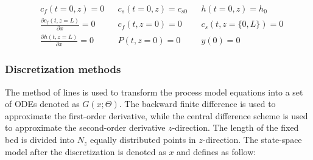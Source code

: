 \documentclass[../Article_Model_Parameters.tex]{subfiles}
\begin{document}

			
			{\footnotesize
				\begin{align*}
					&c_f(t = 0, z) = 0 && c_s(t = 0, z) = c_{s0} && h(t = 0, z) = h_0 \\
					&\frac{\partial c_f(t,z=L)}{\partial x} = 0 && c_f(t, z=0) = 0 && c_s(t, z=\{0,L\}) = 0 \\
					&\frac{\partial h(t,z=L)}{\partial x} = 0 && P(t, z=0) = 0  && y(0) = 0
			\end{align*} }
			
		\subsubsection{Discretization methods}
		
		The method of lines is used to transform the process model equations into a set of ODEs denoted as $G(x;\Theta)$. The backward finite difference is used to approximate the first-order derivative, while the central difference scheme is used to approximate the second-order derivative $z$-direction. The length of the fixed bed is divided into $N_z$ equally distributed points in $z$-direction. The state-space model after the discretization is denoted as $x$ and defines as follow:
		
\end{document}
